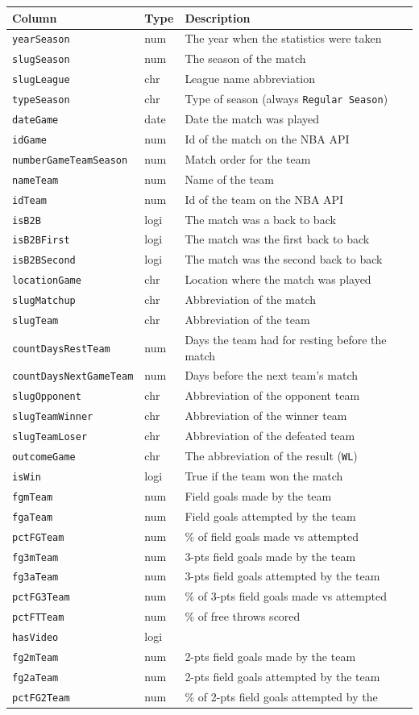 \documentclass[
]{article}
\begin{document}
\begin{longtable}[]{@{}lll@{}}
\toprule
Column & Type & Description\tabularnewline
\midrule
\endhead
\texttt{yearSeason} & num & The year when the statistics were
taken\tabularnewline
\texttt{slugSeason} & num & The season of the match\tabularnewline
\texttt{slugLeague} & chr & League name abbreviation\tabularnewline
\texttt{typeSeason} & chr & Type of season (always
\texttt{Regular\ Season})\tabularnewline
\texttt{dateGame} & date & Date the match was played\tabularnewline
\texttt{idGame} & num & Id of the match on the NBA API\tabularnewline
\texttt{numberGameTeamSeason} & num & Match order for the
team\tabularnewline
\texttt{nameTeam} & num & Name of the team\tabularnewline
\texttt{idTeam} & num & Id of the team on the NBA API\tabularnewline
\texttt{isB2B} & logi & The match was a back to back\tabularnewline
\texttt{isB2BFirst} & logi & The match was the first back to
back\tabularnewline
\texttt{isB2BSecond} & logi & The match was the second back to
back\tabularnewline
\texttt{locationGame} & chr & Location where the match was
played\tabularnewline
\texttt{slugMatchup} & chr & Abbreviation of the match\tabularnewline
\texttt{slugTeam} & chr & Abbreviation of the team\tabularnewline
\texttt{countDaysRestTeam} & num & Days the team had for resting before
the match\tabularnewline
\texttt{countDaysNextGameTeam} & num & Days before the next team's
match\tabularnewline
\texttt{slugOpponent} & chr & Abbreviation of the opponent
team\tabularnewline
\texttt{slugTeamWinner} & chr & Abbreviation of the winner
team\tabularnewline
\texttt{slugTeamLoser} & chr & Abbreviation of the defeated
team\tabularnewline
\texttt{outcomeGame} & chr & The abbreviation of the result
(\texttt{W\textbar{}L})\tabularnewline
\texttt{isWin} & logi & True if the team won the match\tabularnewline
\texttt{fgmTeam} & num & Field goals made by the team\tabularnewline
\texttt{fgaTeam} & num & Field goals attempted by the
team\tabularnewline
\texttt{pctFGTeam} & num & \% of field goals made vs
attempted\tabularnewline
\texttt{fg3mTeam} & num & 3-pts field goals made by the
team\tabularnewline
\texttt{fg3aTeam} & num & 3-pts field goals attempted by the
team\tabularnewline
\texttt{pctFG3Team} & num & \% of 3-pts field goals made vs
attempted\tabularnewline
\texttt{pctFTTeam} & num & \% of free throws scored\tabularnewline
\texttt{hasVideo} & logi &\tabularnewline
\texttt{fg2mTeam} & num & 2-pts field goals made by the
team\tabularnewline
\texttt{fg2aTeam} & num & 2-pts field goals attempted by the
team\tabularnewline
\texttt{pctFG2Team} & num & \% of 2-pts field goals attempted by the

\end{longtable}
\end{document}
